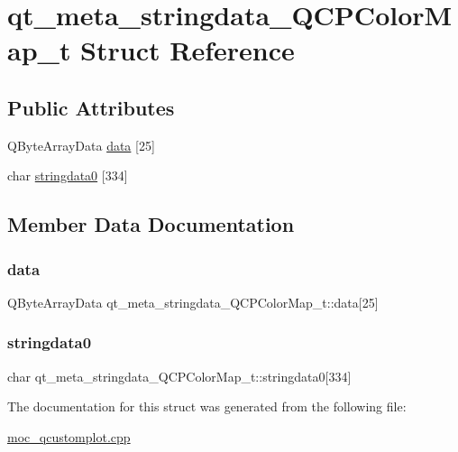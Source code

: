 \hypertarget{structqt__meta__stringdata__QCPColorMap__t}{}\section{qt\+\_\+meta\+\_\+stringdata\+\_\+\+Q\+C\+P\+Color\+Map\+\_\+t Struct Reference}
\label{structqt__meta__stringdata__QCPColorMap__t}
\subsection*{Public Attributes}
\begin{DoxyCompactItemize}
\item 
Q\+Byte\+Array\+Data \mbox{\hyperlink{structqt__meta__stringdata__QCPColorMap__t_accab0e8d36920ac71eecd79ccaa7badf}{data}} \mbox{[}25\mbox{]}
\item 
char \mbox{\hyperlink{structqt__meta__stringdata__QCPColorMap__t_a2edec26054af0f1b2cc81406b21fca92}{stringdata0}} \mbox{[}334\mbox{]}
\end{DoxyCompactItemize}


\subsection{Member Data Documentation}
\mbox{\label{structqt__meta__stringdata__QCPColorMap__t_accab0e8d36920ac71eecd79ccaa7badf}} 
\subsubsection{\texorpdfstring{data}{data}}
{\footnotesize\ttfamily Q\+Byte\+Array\+Data qt\+\_\+meta\+\_\+stringdata\+\_\+\+Q\+C\+P\+Color\+Map\+\_\+t\+::data\mbox{[}25\mbox{]}}

\mbox{\label{structqt__meta__stringdata__QCPColorMap__t_a2edec26054af0f1b2cc81406b21fca92}} 
\subsubsection{\texorpdfstring{stringdata0}{stringdata0}}
{\footnotesize\ttfamily char qt\+\_\+meta\+\_\+stringdata\+\_\+\+Q\+C\+P\+Color\+Map\+\_\+t\+::stringdata0\mbox{[}334\mbox{]}}



The documentation for this struct was generated from the following file\+:\begin{DoxyCompactItemize}
\item 
\mbox{\hyperlink{moc__qcustomplot_8cpp}{moc\+\_\+qcustomplot.\+cpp}}\end{DoxyCompactItemize}
